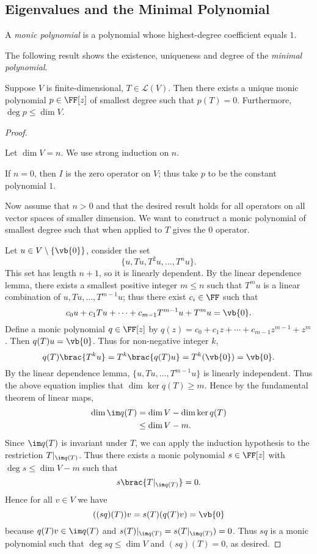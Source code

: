 \subsection{Eigenvalues and the Minimal Polynomial}
A \emph{monic polynomial} is a polynomial whose highest-degree coefficient equals $1$.

The following result shows the existence, uniqueness and degree of the \emph{minimal polynomial}.

\begin{lemma}
Suppose $V$ is finite-dimensional, $T\in\mathcal{L}(V)$. Then there exists a unique monic polynomial $p\in\FF[z]$ of smallest degree such that $p(T)=0$. Furthermore, $\deg p\le\dim V$.
\end{lemma}

\begin{proof} \

 Let $\dim V=n$. We use strong induction on $n$.

If $n=0$, then $I$ is the zero operator on $V$; thus take $p$ to be the constant polynomial $1$.

Now assume that $n>0$ and that the desired result holds for all operators on all vector spaces of smaller dimension. We want to construct a monic polynomial of smallest degree such that when applied to $T$ gives the $0$ operator.

Let $u\in V\setminus\{\vb{0}\}$, consider the set
\[\{u,Tu,T^2u,\dots,T^nu\}.\]
This set has length $n+1$, so it is linearly dependent. By the linear dependence lemma, there exists a smallest positive integer $m\le n$ such that $T^mu$ is a linear combination of $u,Tu,\dots,T^{m-1}u$; thus there exist $c_i\in\FF$ such that
\[c_0u+c_1Tu+\cdots+c_{m-1}T^{m-1}u+T^mu=\vb{0}.\]
Define a monic polynomial $q\in\FF[z]$ by $q(z)=c_0+c_1z+\cdots+c_{m-1}z^{m-1}+z^m$. Then $q(T)u=\vb{0}$. Thus for non-negative integer $k$,
\[q(T)\brac{T^ku}=T^k\brac{q(T)u}=T^k(\vb{0})=\vb{0}.\]
By the linear dependence lemma, $\{u,Tu,\dots,T^{m-1}u\}$ is linearly independent. Thus the above equation implies that $\dim\ker q(T)\ge m$. Hence by the fundamental theorem of linear maps,
\begin{align*}
\dim\im q(T)&=\dim V-\dim\ker q(T)\\
&\le\dim V-m.
\end{align*}
Since $\im q(T)$ is invariant under $T$, we can apply the induction hypothesis to the restriction $T|_{\im q(T)}$. Thus there exists a monic polynomial $s\in\FF[z]$ with $\deg s\le \dim V-m$ such that
\[s\brac{T|_{\im q(T)}}=0.\]
Hence for all $v\in V$ we have
\[((sq)(T))v=s(T)(q(T)v)=\vb{0}\]
because $q(T)v\in\im q(T)$ and $s(T)|_{\im q(T)}=s(T|_{\im q(T)})=0$. Thus $sq$ is a monic polynomial such that $\deg sq\le\dim V$ and $(sq)(T)=0$, as desired.


\end{proof}
